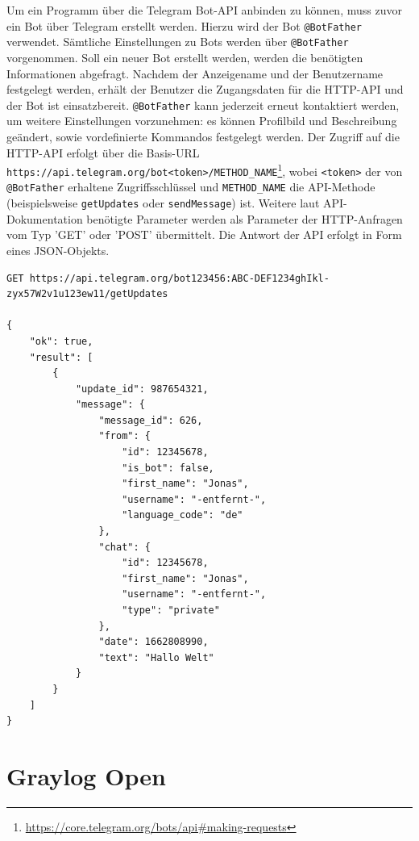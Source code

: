 Um ein Programm über die Telegram Bot-API anbinden zu können, muss zuvor ein Bot über Telegram erstellt werden. Hierzu wird der Bot \lstinline{@BotFather} verwendet. Sämtliche Einstellungen zu Bots werden über \lstinline{@BotFather} vorgenommen. Soll ein neuer Bot erstellt werden, werden die benötigten Informationen abgefragt. Nachdem der Anzeigename und der Benutzername festgelegt werden, erhält der Benutzer die Zugangsdaten für die HTTP-API und der Bot ist einsatzbereit. \lstinline{@BotFather} kann jederzeit erneut kontaktiert werden, um weitere Einstellungen vorzunehmen: es können Profilbild und Beschreibung geändert, sowie vordefinierte Kommandos festgelegt werden. Der Zugriff auf die HTTP-API erfolgt über die Basis-URL \lstinline{https://api.telegram.org/bot<token>/METHOD_NAME}\footnote{\url{https://core.telegram.org/bots/api\#making-requests}}, wobei \lstinline{<token>} der von \lstinline{@BotFather} erhaltene Zugriffsschlüssel und \lstinline{METHOD_NAME} die API-Methode (beispielsweise \lstinline{getUpdates} oder \lstinline{sendMessage}) ist. Weitere laut API-Dokumentation benötigte Parameter werden als Parameter der HTTP-Anfragen vom Typ 'GET' oder 'POST' übermittelt. Die Antwort der API erfolgt in Form eines JSON-Objekts.

\begin{lstlisting}[caption={Beispiel eines Aufrufs der Telegram HTTP-API. Erhalt einer Textnachricht "Hallo Welt".}, label=lst:bsp-telegram-api, xleftmargin=6mm]
GET https://api.telegram.org/bot123456:ABC-DEF1234ghIkl-zyx57W2v1u123ew11/getUpdates

{
    "ok": true,
    "result": [
        {
            "update_id": 987654321,
            "message": {
                "message_id": 626,
                "from": {
                    "id": 12345678,
                    "is_bot": false,
                    "first_name": "Jonas",
                    "username": "-entfernt-",
                    "language_code": "de"
                },
                "chat": {
                    "id": 12345678,
                    "first_name": "Jonas",
                    "username": "-entfernt-",
                    "type": "private"
                },
                "date": 1662808990,
                "text": "Hallo Welt"
            }
        }
    ]
}
\end{lstlisting}

\section{Graylog Open}

